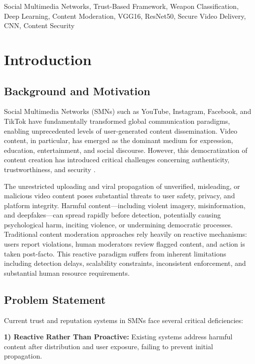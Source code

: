 \documentclass[conference]{IEEEtran}
\begin{document}
\begin{IEEEkeywords}
Social Multimedia Networks, Trust-Based Framework, Weapon Classification, Deep Learning, Content Moderation, VGG16, ResNet50, Secure Video Delivery, CNN, Content Security
\end{IEEEkeywords}

\section{Introduction}

\subsection{Background and Motivation}

Social Multimedia Networks (SMNs) such as YouTube, Instagram, Facebook, and TikTok have fundamentally transformed global communication paradigms, enabling unprecedented levels of user-generated content dissemination. Video content, in particular, has emerged as the dominant medium for expression, education, entertainment, and social discourse. However, this democratization of content creation has introduced critical challenges concerning authenticity, trustworthiness, and security \cite{yang2012advance}.

The unrestricted uploading and viral propagation of unverified, misleading, or malicious video content poses substantial threats to user safety, privacy, and platform integrity. Harmful content—including violent imagery, misinformation, and deepfakes—can spread rapidly before detection, potentially causing psychological harm, inciting violence, or undermining democratic processes. Traditional content moderation approaches rely heavily on reactive mechanisms: users report violations, human moderators review flagged content, and action is taken post-facto. This reactive paradigm suffers from inherent limitations including detection delays, scalability constraints, inconsistent enforcement, and substantial human resource requirements.

\subsection{Problem Statement}

Current trust and reputation systems in SMNs face several critical deficiencies:

\textbf{1) Reactive Rather Than Proactive:} Existing systems address harmful content after distribution and user exposure, failing to prevent initial propagation.
\end{document}
